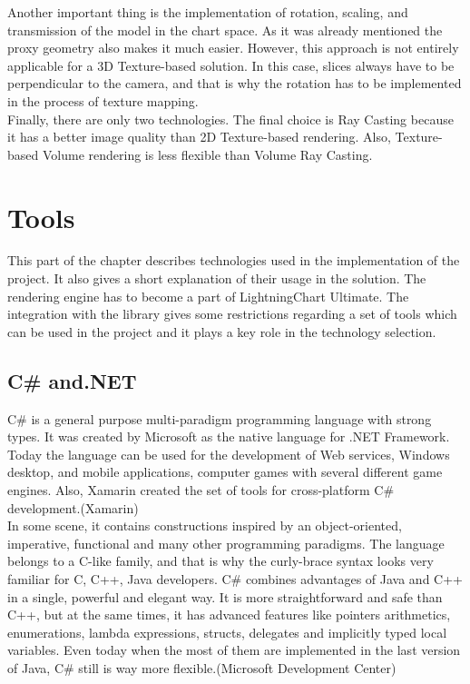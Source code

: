 \documentclass[twoside, english, 11pt]{report}
\begin{document}
Another important thing is the implementation of rotation, scaling, and transmission of the model in the chart space. As it was already mentioned the proxy geometry also makes it much easier. However, this approach is not entirely applicable for a 3D Texture-based solution. In this case, slices always have to be perpendicular to the camera, and that is why the rotation has to be implemented in the process of texture mapping.\\

Finally, there are only two technologies. The final choice is Ray Casting because it has a better image quality than 2D Texture-based rendering. Also, Texture-based Volume rendering is less flexible than Volume Ray Casting.
\section{Tools}
This part of the chapter describes technologies used in the implementation of the project. It also gives a short explanation of their usage in the solution. The rendering engine has to become a part of LightningChart Ultimate. The integration with the library gives some restrictions regarding a set of tools which can be used in the project and it plays a key role in the technology selection.
\subsection{C\# and.NET}
C\# is a general purpose multi-paradigm programming language with strong types. It was created by Microsoft as the native language for .NET Framework. Today the language can be used for the development of Web services, Windows desktop, and mobile applications, computer games with several different game engines. Also, Xamarin created the set of tools for cross-platform C\# development.(Xamarin)\\

In some scene, it contains constructions inspired by an object-oriented, imperative, functional and many other programming paradigms. The language belongs to a C-like family, and that is why the curly-brace syntax looks very familiar for C, C++, Java developers. C\# combines advantages of Java and C++ in a single, powerful and elegant way. It is more straightforward and safe than C++, but at the same times, it has advanced features like pointers arithmetics, enumerations, lambda expressions, structs, delegates and implicitly typed local variables. Even today when the most of them are implemented in the last version of Java, C\# still is way more flexible.(Microsoft Development Center)\\
\end{document}
